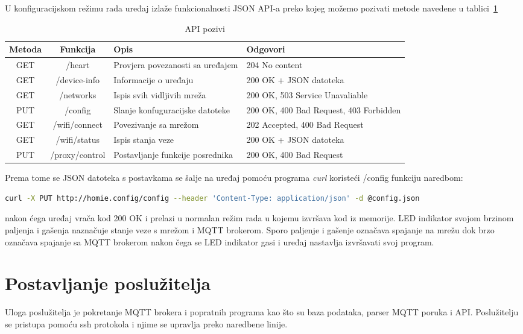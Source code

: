 \documentclass[times, utf8, zavrsni]{fer}
\begin{document}
U konfiguracijskom režimu rada uređaj izlaže funkcionalnosti JSON API-a preko kojeg možemo pozivati metode navedene u tablici~\ref{tab:API}
    \begin{table}[h]
        \centering
        \begin{tabular}{ |c|c|p{4cm}|p{4cm}| }
            \hline
            Metoda & Funkcija & Opis & Odgovori\\
            \hline
            GET & /heart & Provjera povezanosti sa uređajem & 204 No content \\
            \hline
            GET & /device-info & Informacije o uređaju & 200 OK + JSON datoteka\\
            \hline
            GET & /networks & Ispis svih vidljivih mreža & 200 OK, 503 Service Unavaliable \\
            \hline
            PUT & /config & Slanje konfuguracijske datoteke & 200 OK, 400 Bad Request, 403 Forbidden\\
            \hline
            GET & /wifi/connect & Povezivanje sa mrežom & 202 Accepted, 400 Bad Request\\
            \hline
            GET & /wifi/status & Ispis stanja veze & 200 OK + JSON datoteka\\
            \hline
            PUT & /proxy/control & Postavljanje funkcije posrednika & 200 OK, 400 Bad Request\\
            \hline
        \end{tabular}
        \caption{API pozivi}\label{tab:API}
    \end{table}
Prema tome se JSON datoteka s postavkama se šalje na uređaj pomoću programa \textit{curl} koristeći /config funkciju naredbom:
\begin{lstlisting}[language=Bash]
curl -X PUT http://homie.config/config --header 'Content-Type: application/json' -d @config.json
\end{lstlisting}

nakon ćega uređaj vrača kod 200 OK i prelazi u normalan režim rada u kojemu izvršava kod iz memorije.
LED indikator svojom brzinom paljenja i gašenja naznačuje stanje veze s mrežom i MQTT brokerom.
Sporo paljenje i gašenje označava spajanje na mrežu dok brzo označava spajanje sa MQTT brokerom nakon čega se LED indikator gasi i uređaj nastavlja izvršavati svoj program.



\section{Postavljanje poslužitelja}
Uloga poslužitelja je pokretanje MQTT brokera i popratnih programa kao što su baza podataka, parser MQTT poruka i API.
Poslužitelju se pristupa pomoću ssh protokola i njime se upravlja preko naredbene linije.
\end{document}
